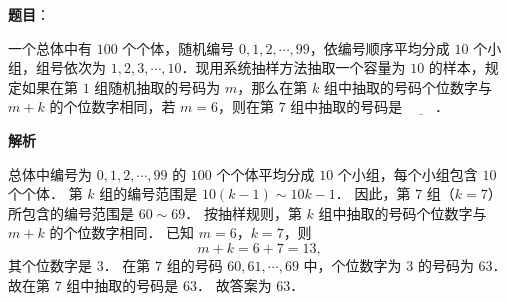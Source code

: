 \begin{answer}

\textbf{题目}：

一个总体中有 $100$ 个个体，随机编号 $0, 1, 2, \cdots, 99$，依编号顺序平均分成 $10$ 个小组，组号依次为 $1, 2, 3, \cdots, 10$．现用系统抽样方法抽取一个容量为 $10$ 的样本，规定如果在第 $1$ 组随机抽取的号码为 $m$，那么在第 $k$ 组中抽取的号码个位数字与 $m + k$ 的个位数字相同，若 $m = 6$，则在第 $7$ 组中抽取的号码是 $\underline{\quad\quad}$．

\textbf{解析}

总体中编号为 $0, 1, 2, \cdots, 99$ 的 $100$ 个个体平均分成 $10$ 个小组，每个小组包含 $10$ 个个体．
第 $k$ 组的编号范围是 $10(k - 1) \sim 10k - 1$．
因此，第 $7$ 组（$k = 7$）所包含的编号范围是 $60 \sim 69$．
按抽样规则，第 $k$ 组中抽取的号码个位数字与 $m + k$ 的个位数字相同．
已知 $m = 6$，$k = 7$，则
\nopagebreak[4]
\[
m + k = 6 + 7 = 13,
\]
其个位数字是 $3$．
在第 $7$ 组的号码 $60, 61, \cdots, 69$ 中，个位数字为 $3$ 的号码为 $63$．
故在第 $7$ 组中抽取的号码是 $63$．
故答案为 $63$．


\end{answer}
